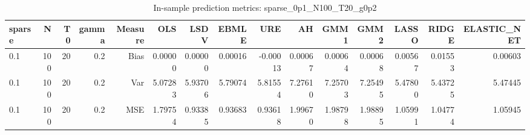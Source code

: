 \begin{table}[!htbp]\centering
\caption{In-sample prediction metrics: sparse_0p1_N100_T20_g0p2}
\label{tab:table2_sparse_0p1_N100_T20_g0p2}
\begin{tabular}{lrrrrrrrrrrrrrr}
\hline
sparse & N & T0 & gamma & Measure & OLS & LSDV & EBMLE & URE & AH & GMM1 & GMM2 & LASSO & RIDGE & ELASTIC_NET \\
\hline
0.1 & 100 & 20 & 0.2 & Bias & 0.00000 & 0.00000 & 0.00016 & -0.00013 & 0.00067 & 0.00064 & 0.00068 & 0.00567 & 0.01553 & 0.00603 \\
0.1 & 100 & 20 & 0.2 & Var & 5.07283 & 5.93706 & 5.79074 & 5.81554 & 7.27610 & 7.25703 & 7.25495 & 5.47800 & 5.43725 & 5.47445 \\
0.1 & 100 & 20 & 0.2 & MSE & 1.79754 & 0.93385 & 0.93683 & 0.93618 & 1.99670 & 1.98798 & 1.98895 & 1.05991 & 1.04774 & 1.05945 \\
\hline
\end{tabular}
\end{table}

